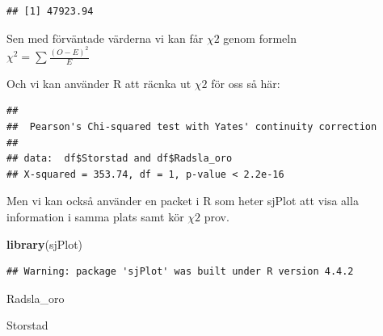 \documentclass[
]{book}
\newenvironment{Shaded}{\begin{snugshade}}{\end{snugshade}}
\newcommand{\AttributeTok}[1]{\textcolor[rgb]{0.13,0.29,0.53}{#1}}
\newcommand{\ConstantTok}[1]{\textcolor[rgb]{0.56,0.35,0.01}{#1}}
\newcommand{\FunctionTok}[1]{\textcolor[rgb]{0.13,0.29,0.53}{\textbf{#1}}}
\newcommand{\NormalTok}[1]{#1}
\newcommand{\SpecialCharTok}[1]{\textcolor[rgb]{0.81,0.36,0.00}{\textbf{#1}}}
\begin{document}
\begin{verbatim}
## [1] 47923.94
\end{verbatim}

Sen med förväntade värderna vi kan får \(\chi {2}\) genom formeln\\
\(\chi ^{2}=\sum \frac{(O-E)^2}{E}\)

Och vi kan använder R att räcnka ut \(\chi {2}\) för oss så här:

\begin{Shaded}
\end{Shaded}

\begin{verbatim}
## 
##  Pearson's Chi-squared test with Yates' continuity correction
## 
## data:  df$Storstad and df$Radsla_oro
## X-squared = 353.74, df = 1, p-value < 2.2e-16
\end{verbatim}

Men vi kan också använder en packet i R som heter sjPlot att visa alla information i samma plats samt kör \(\chi {2}\) prov.

\begin{Shaded}
\begin{Highlighting}[]
\FunctionTok{library}\NormalTok{(sjPlot)}
\end{Highlighting}
\end{Shaded}

\begin{verbatim}
## Warning: package 'sjPlot' was built under R version 4.4.2
\end{verbatim}

\begin{Shaded}
\end{Shaded}

Radsla\_oro

Storstad
\end{document}
